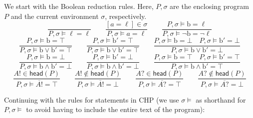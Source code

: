 \documentclass[times, 10pt]{article}
\begin{document}
We start with the Boolean reduction rules. Here, $P, \sigma$ are the enclosing
program $P$ and the current environment $\sigma$, respectively.
$$
    \frac{}{P, \sigma \models \ell = \ell} \qquad
    \frac{[a = \ell] \in \sigma}{P, \sigma \models a = \ell} \qquad
    \frac{P, \sigma \models \mathrm{b} = \ell}{P, \sigma \models \neg \mathrm{b} = \neg \ell} $$$$
    \frac{P, \sigma \models \mathrm{b} = \top}{P, \sigma \models \mathrm{b} \vee \mathrm{b}' = \top} \qquad
    \frac{P, \sigma \models \mathrm{b}' = \top}{P, \sigma \models \mathrm{b} \vee \mathrm{b}' = \top} \qquad
    \frac{P, \sigma \models \mathrm{b} = \bot \quad P, \sigma \models \mathrm{b}' = \bot}{P, \sigma \models \mathrm{b} \vee \mathrm{b}' = \bot} $$$$
    \frac{P, \sigma \models \mathrm{b} = \bot}{P, \sigma \models \mathrm{b} \wedge \mathrm{b}' = \bot} \qquad
    \frac{P, \sigma \models \mathrm{b}' = \bot}{P, \sigma \models \mathrm{b} \wedge \mathrm{b}' = \bot} \qquad
    \frac{P, \sigma \models \mathrm{b} = \top \quad P, \sigma \models \mathrm{b}' = \top}{P, \sigma \models \mathrm{b} \wedge \mathrm{b}' = \top} $$$$
    \frac{A! \in \mathsf{head}(P)}{P, \sigma \models \overline{A!} = \top} \qquad
    \frac{A! \notin \mathsf{head}(P)}{P, \sigma \models \overline{A!} = \bot} \qquad
    \frac{A? \in \mathsf{head}(P)}{P, \sigma \models \overline{A?} = \top} \qquad
    \frac{A? \notin \mathsf{head}(P)}{P, \sigma \models \overline{A?} = \bot}
$$

Continuing with the rules for statements in CHP (we use $\sigma \models$ as
shorthand for $P, \sigma \models$ to avoid having to include the entire text of
the program):
\end{document}
